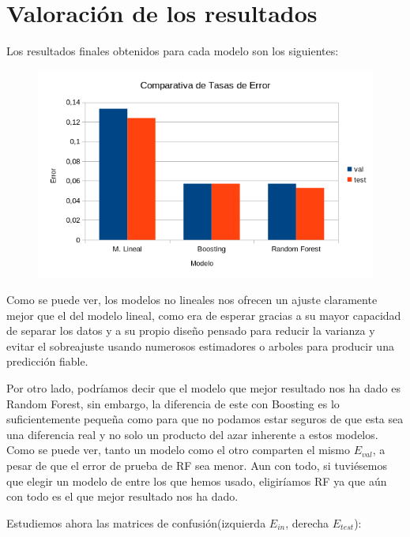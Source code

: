 \documentclass{article}
\begin{document}
	\section{Valoración de los resultados} %
	Los resultados finales obtenidos para cada modelo son los siguientes:
	\begin{figure}[H]
	  \includegraphics[width=\linewidth]{Imagenes/CE.png}
	  \label{fig:boat1}
	\end{figure}
	Como se puede ver, los modelos no lineales nos ofrecen un ajuste claramente mejor que el del modelo lineal, como era de esperar gracias a su mayor capacidad de separar los datos y a su propio diseño pensado para reducir la varianza y evitar el sobreajuste usando numerosos estimadores o arboles para producir una predicción fiable. 
	\par 
	Por otro lado, podríamos decir que el modelo que mejor resultado nos ha dado es Random Forest, sin embargo, la diferencia de este con Boosting es lo suficientemente pequeña como para que no podamos estar seguros de que esta sea una diferencia real y no solo un producto del azar inherente a estos modelos. Como se puede ver, tanto un modelo como el otro comparten el mismo $E_{val}$, a pesar de que el error de prueba de RF sea menor. Aun con todo, si tuviésemos que elegir un modelo de entre los que hemos usado, eligiríamos RF ya que aún con todo es el que mejor resultado nos ha dado.
	\par
	Estudiemos ahora las matrices de confusión(izquierda $E_{in}$, derecha ${E_{test}}$):
	
\end{document}
